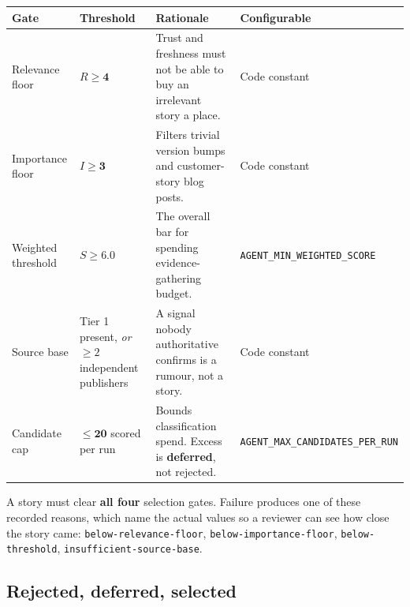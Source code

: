 \documentclass[11pt,a4paper]{article}
\newcommand{\var}[1]{\texttt{\small\hyphenpenalty=0\exhyphenpenalty=0\relax #1}}
\newcommand{\us}{\_\discretionary{}{}{}}
\newcommand{\brk}{\hyphenpenalty=0\exhyphenpenalty=0\relax}
\newcommand{\code}[1]{\texttt{\small\brk #1}}
\begin{document}
\begin{center}
\small
\begin{tabularx}{\textwidth}{@{}>{\RaggedRight}p{2.5cm} >{\RaggedRight}p{3.1cm} >{\RaggedRight}X >{\RaggedRight}p{3.3cm}@{}}
\toprule
\textbf{Gate} & \textbf{Threshold} & \textbf{Rationale} & \textbf{Configurable} \\
\midrule
Relevance floor & $R \geq \mathbf{4}$ &
  Trust and freshness must not be able to buy an irrelevant story a place. &
  Code constant \\
Importance floor & $I \geq \mathbf{3}$ &
  Filters trivial version bumps and customer-story blog posts. &
  Code constant \\
Weighted threshold & $S \geq \mathbf{6.0}$ &
  The overall bar for spending evidence-gathering budget. &
  \var{AGENT\us MIN\us WEIGHTED\us SCORE} \\
Source base & Tier 1 present, \emph{or} $\geq 2$ independent publishers &
  A signal nobody authoritative confirms is a rumour, not a story. &
  Code constant \\
Candidate cap & $\leq \mathbf{20}$ scored per run &
  Bounds classification spend. Excess is \textbf{deferred}, not rejected. &
  \var{AGENT\us MAX\us CANDIDATES\us PER\us RUN} \\
\bottomrule
\end{tabularx}
\end{center}

\begin{blockbox}
A story must clear \textbf{all four} selection gates. Failure produces one of
these recorded reasons, which name the actual values so a reviewer can see how
close the story came: \code{below-relevance-floor}, \code{below-importance-floor},
\code{below-threshold}, \code{insufficient-}\allowbreak\code{source-base}.
\end{blockbox}

\subsection{Rejected, deferred, selected}
\end{document}
